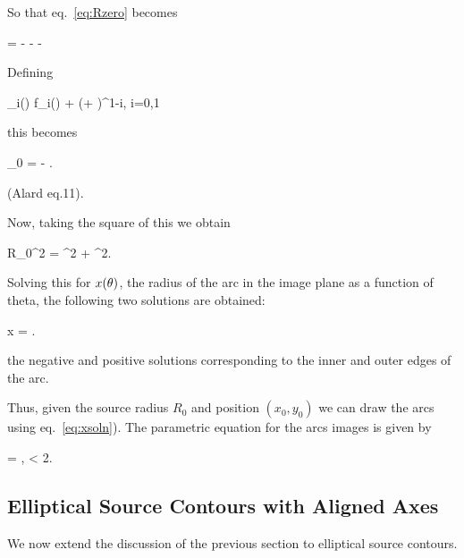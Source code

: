 So that eq.~\eqref{eq:Rzero} becomes

\beq
{} =  - 
 \hat{\theta} -  \left[ \yone \, 
\cos \te + \ytwo \,  \sin \te \right]  - \left[ -\yone \,  \sin \te +
\ytwo \,  \cos \te \right] \hat{\theta} \;\;\;
\eeq


Defining

\beq
{}_i(\theta) \equiv f_i(\theta) + (\yone \cos \te + \ytwo \sin
\te)\re^{1-i}, \;\; i=0,1
\eeq

this becomes

\beq
{}_{0} =  -
 
\hat{\theta}. \;\;\; \label{eq:Alard11}
\eeq

(Alard eq.11).

Now, taking the square of this we obtain

\beq
R_{0}^2 = ^2 +
^2. \;\;\;
\eeq

Solving this for $x(\theta)$, the radius of the arc in the image plane as
a function of theta, the following two solutions are obtained:

\beq
\label{eq:xsoln}
x = . \;\;\;
\eeq

the negative and positive solutions corresponding to the inner and outer edges
of the arc.

Thus, given the source radius $R_{0}$ and position $(x_0,y_0)$ we can
draw the arcs using eq.~\eqref{eq:xsoln}). The parametric equation for the
arcs images is given by

\beq
\label{eq:parametricarcs}
= ,  \leq \te <
2\pi.
\eeq


\subsection{Elliptical Source Contours with Aligned Axes}

We now extend the discussion of the previous section to elliptical
source contours.

